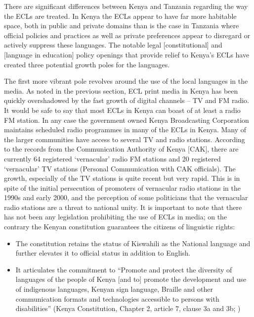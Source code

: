 \documentclass[output=paper,colorlinks,citecolor=brown]{langscibook}
\begin{document}
There are significant differences between Kenya and Tanzania regarding the way the ECLs are treated. In Kenya the ECLs appear to have far more habitable space, both in public and private domains than is the case in Tanzania where official policies and practices as well as private preferences appear to disregard or actively suppress these languages. The notable legal [constitutional] and [language in education] policy openings that provide relief to Kenya’s ECLs have created three potential growth poles for the languages. 

The first more vibrant pole revolves around the use of the local languages in the media. As noted in the previous section, ECL print media in Kenya has been quickly overshadowed by the fast growth of digital channels – TV and FM radio. It would be safe to say that most ECLs in Kenya can boast of at least a radio FM station. In any case the government owned Kenya Broadcasting Corporation maintains scheduled radio programmes in many of the ECLs in Kenya. Many of the larger communities have access to several TV and radio stations. According to the records from the Communication Authority of Kenya [CAK], there are currently 64 registered ‘vernacular’ radio FM stations and 20 registered ‘vernacular’ TV stations (Personal Communication with CAK officials).  The growth, especially of the TV stations is quite recent but very rapid.  This is in spite of the initial persecution of promoters of vernacular radio stations in the 1990s and early 2000, and the perception of some politicians that the vernacular radio stations are a threat to national unity.  It is important to note that there has not been any legislation prohibiting the use of ECLs in media; on the contrary the Kenyan constitution guarantees the citizens of linguistic rights:

\begin{itemize}
    \item The constitution retains the status of Kiswahili as the National language and further elevates it to official status in addition to English.  
    \item It articulates the commitment to “Promote and protect the diversity of languages of the people of Kenya [and to] promote the development and use of indigenous languages, Kenyan sign language, Braille and other communication formats and technologies accessible to persons with disabilities” (Kenya Constitution, Chapter 2, article 7, clause 3a and 3b; \citealt{Republic-of-Kenya2010})

\end{itemize}{}
\end{document}
